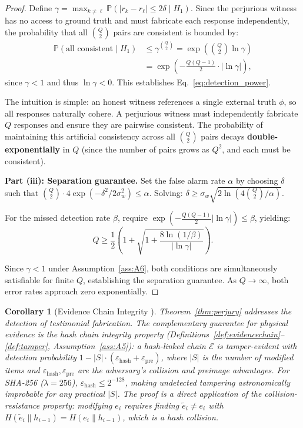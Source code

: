 \documentclass[11pt,a4paper]{article}
\newtheorem{corollary}[theorem]{Corollary}
\theoremstyle{definition}
\newcommand{\Pbb}{\mathbb{P}}
\newcommand{\abs}[1]{\left|#1\right|}
\newcommand{\fact}{\phi}                        %
\newcommand{\evidenceChain}{\mathcal{E}}        %
\newcommand{\hashFunc}{H}                       %
\begin{document}
\begin{proof}
Define $\gamma = \max_{k \neq \ell} \Pbb(\abs{r_k - r_\ell} \leq 2\delta \mid H_1)$. Since the perjurious witness has no access to ground truth and must fabricate each response independently, the probability that all $\binom{Q}{2}$ pairs are consistent is bounded by:
\begin{align}
    \Pbb(\text{all consistent} \mid H_1) &\leq \gamma^{\binom{Q}{2}} = \exp\left(\binom{Q}{2} \ln \gamma\right) \nonumber\\
    &= \exp\left(-\frac{Q(Q-1)}{2} \cdot \abs{\ln \gamma}\right),
\end{align}
since $\gamma < 1$ and thus $\ln \gamma < 0$. This establishes Eq.~\eqref{eq:detection_power}.

The intuition is simple: an honest witness references a single external truth $\fact$, so all responses naturally cohere. A perjurious witness must independently fabricate $Q$ responses and ensure they are pairwise consistent. The probability of maintaining this artificial consistency across all $\binom{Q}{2}$ pairs decays \textbf{double-exponentially} in $Q$ (since the number of pairs grows as $Q^2$, and each must be consistent).

\medskip\noindent\textbf{Part (iii): Separation guarantee.}
Set the false alarm rate $\alpha$ by choosing $\delta$ such that $\binom{Q}{2} \cdot 4\exp(-\delta^2 / 2\sigma_w^2) \leq \alpha$. Solving: $\delta \geq \sigma_w \sqrt{2\ln(4\binom{Q}{2} / \alpha)}$.

For the missed detection rate $\beta$, require $\exp(-\frac{Q(Q-1)}{2} \abs{\ln \gamma}) \leq \beta$, yielding:
\begin{equation}
    Q \geq \frac{1}{2}\left(1 + \sqrt{1 + \frac{8\ln(1/\beta)}{\abs{\ln \gamma}}}\right).
\end{equation}

Since $\gamma < 1$ under Assumption~\ref{ass:A6}, both conditions are simultaneously satisfiable for finite $Q$, establishing the separation guarantee. As $Q \to \infty$, both error rates approach zero exponentially.
\end{proof}

\begin{corollary}[Evidence Chain Integrity ]
\label{cor:hashchain_integrity}
Theorem~\ref{thm:perjury} addresses the detection of \textit{testimonial} fabrication. The complementary guarantee for \textit{physical} evidence is the hash chain integrity property (Definitions~\ref{def:evidencechain}--\ref{def:tamper}, Assumption~\ref{ass:A5}): a hash-linked chain $\evidenceChain$ is tamper-evident with detection probability $1 - \abs{S} \cdot (\varepsilon_{\mathrm{hash}} + \varepsilon_{\mathrm{pre}})$, where $\abs{S}$ is the number of modified items and $\varepsilon_{\mathrm{hash}}, \varepsilon_{\mathrm{pre}}$ are the adversary's collision and preimage advantages. For SHA-256 ($\lambda = 256$), $\varepsilon_{\mathrm{hash}} \leq 2^{-128}$, making undetected tampering astronomically improbable for any practical $\abs{S}$. The proof is a direct application of the collision-resistance property: modifying $e_i$ requires finding $\tilde{e}_i \neq e_i$ with $\hashFunc(\tilde{e}_i \| h_{i-1}) = \hashFunc(e_i \| h_{i-1})$, which is a hash collision.
\end{corollary}
\end{document}
